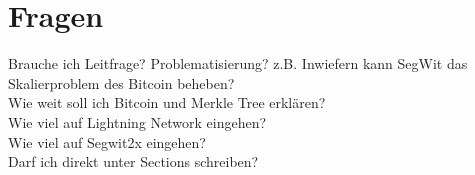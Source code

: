 
\section{Fragen}
Brauche ich Leitfrage? Problematisierung? z.B. Inwiefern kann SegWit das Skalierproblem des Bitcoin beheben? \\
Wie weit soll ich Bitcoin und Merkle Tree erklären? \\
Wie viel auf Lightning Network eingehen? \\
Wie viel auf Segwit2x eingehen? \\
Darf ich direkt unter Sections schreiben?